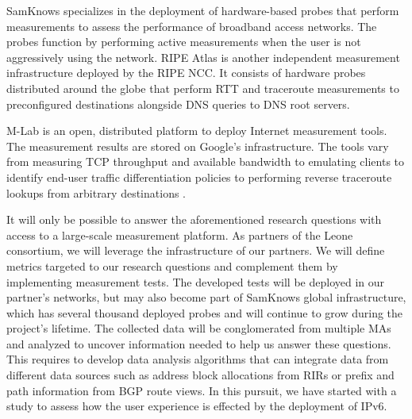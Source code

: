 SamKnows specializes in the deployment of hardware-based probes that perform
measurements to assess the performance of broadband access networks. The
probes function by performing active measurements when the user is not
aggressively using the network.  RIPE Atlas is another independent measurement
infrastructure deployed by the RIPE NCC. It consists of hardware probes
distributed around the globe that perform RTT and traceroute measurements to
preconfigured destinations alongside DNS queries to DNS root servers.

\ac{M-Lab} \cite{dovrolis:2010} is an open, distributed platform to deploy
Internet measurement tools. The measurement results are stored on Google's
infrastructure. The tools vary from measuring TCP throughput and available
bandwidth to emulating clients to identify end-user traffic differentiation
policies \cite{dischinger:2010, kanuparthy:2011} to performing reverse
traceroute lookups from arbitrary destinations \cite{bassett:2010}.

It will only be possible to answer the aforementioned research questions with
access to a large-scale measurement platform. As partners of the Leone
consortium, we will leverage the infrastructure of our partners. We will
define metrics targeted to our research questions and complement them by
implementing measurement tests. The developed tests will be deployed in our
partner's networks, but may also become part of SamKnows global
infrastructure, which has several thousand deployed probes and will continue
to grow during the project's lifetime. The collected data will be
conglomerated from multiple \ac{MA}s and analyzed to uncover information
needed to help us answer these questions. This requires to develop data
analysis algorithms that can integrate data from different data sources such
as address block allocations from \ac{RIR}s or prefix and path information
from BGP route views. In this pursuit, we have started with a study to assess
how the user experience is effected by the deployment of IPv6.

